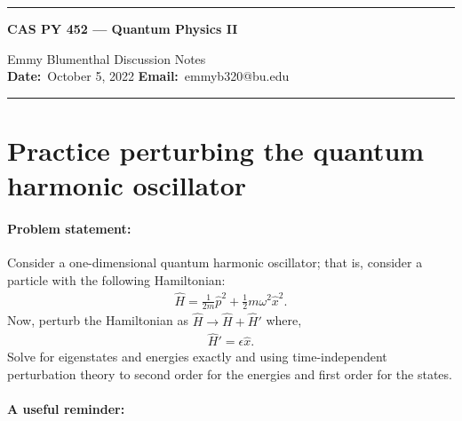\documentclass[10pt]{article}
\newcommand{\1}{\mathbf 1}
\begin{document}
\begin{center}
	\hrule
	\vspace{.4cm}
	{\textbf { \large CAS PY 452 --- Quantum Physics II}}
\end{center}
Emmy Blumenthal \hspace{\fill} \hspace{\fill}  \textbf{} Discussion Notes\  \\
\textbf{Date:}\  October 5, 2022   \hspace{\fill} \textbf{Email:}\ emmyb320@bu.edu

\vspace{.4cm}
\hrule

\section*{Practice perturbing the quantum harmonic oscillator}

\paragraph{Problem statement:}
Consider a one-dimensional quantum harmonic oscillator; that is, consider a particle with the following Hamiltonian:
\begin{align}
	\hat H
	=
	\frac{1}{2m} \hat p^2
	+
	\frac{1}{2} m \omega^2 \hat x^2.
\end{align}
Now, perturb the Hamiltonian as $\hat H \to \hat H + \hat H'$ where,
\begin{align}
	\hat H'
	=
	\epsilon \hat x.
\end{align}
Solve for eigenstates and energies exactly and using time-independent perturbation theory to second order for the energies and first order for the states.

\paragraph{A useful reminder:}
\end{document}
